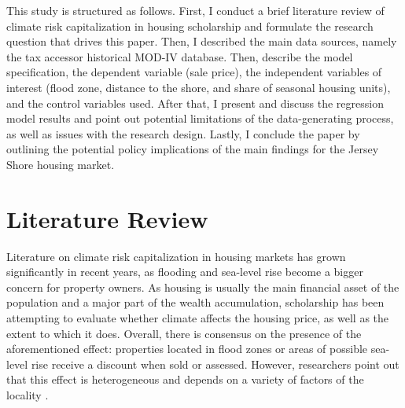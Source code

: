 \documentclass[11pt]{article}
\begin{document}
This study is structured as follows. First, I conduct a brief literature review of climate risk capitalization in housing scholarship and formulate the research question that drives this paper. Then, I described the main data sources, namely the tax accessor historical MOD-IV database. Then, describe the model specification, the dependent variable (sale price), the independent variables of interest (flood zone, distance to the shore, and share of seasonal housing units), and the control variables used. After that, I present and discuss the regression model results and point out potential limitations of the data-generating process, as well as issues with the research design. Lastly, I conclude the paper by outlining the potential policy implications of the main findings for the Jersey Shore housing market.

\section{Literature Review}

Literature on climate risk capitalization in housing markets has grown significantly in recent years, as flooding and sea-level rise become a
bigger concern for property owners. As housing is usually the main financial asset of the population and a major part of the wealth accumulation,
scholarship has been attempting to evaluate whether climate affects the housing price, as well as the extent to which it does. Overall, there is consensus on the presence of the aforementioned effect: properties located in flood zones or areas of possible sea-level rise receive a discount when sold or assessed. However, researchers point out that this effect is heterogeneous and depends on a variety of factors of the locality \parencite{murfinspiegel2020-RiskSeaLevel, baldaufetal2020-DoesClimateChange, sussmanetal2014-EstimatesChangesCountylevel}. 
\end{document}
